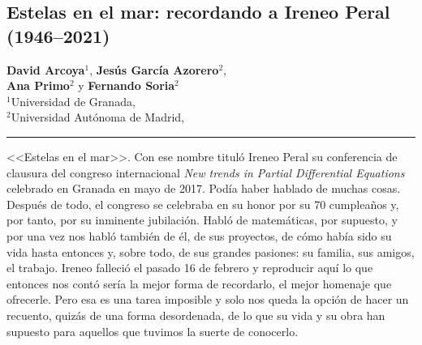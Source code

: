 

%
%

\subsection{Estelas en el mar: recordando a Ireneo Peral (1946--2021)}

\begin{center}\large
\textbf{David Arcoya}$^1$, \textbf{Jes\'us Garc\'ia Azorero}$^2$,\\ \textbf{Ana Primo}$^2$ y
\textbf{Fernando Soria}$^2$\\[1em]
$^1$Universidad de Granada,\\ $^2$Universidad Aut\'onoma de Madrid,\\ 
{\color{azulsema}\rule{.5\linewidth}{1pt}}
\end{center}
%

<<Estelas en el mar>>. Con ese nombre titul\'o Ireneo Peral su conferencia de clausura del congreso internacional {\it New trends in Partial Differential Equations} celebrado en Granada en mayo de 2017. Pod\'ia haber hablado de muchas cosas. Despu\'es de todo, el congreso se celebraba en su honor por su 70 cumplea\~nos y, por tanto, por su inminente jubilaci\'on. Habl\'o de matem\'aticas, por supuesto, y por una vez nos habl\'o tambi\'en de \'el, de sus proyectos, de c\'omo hab\'ia sido su vida hasta entonces y, sobre todo, de sus grandes pasiones: su familia, sus amigos, el trabajo. Ireneo falleci\'o el pasado 16 de febrero y reproducir aqu\'i lo que entonces nos cont\'o ser\'ia la mejor forma de recordarlo, el mejor homenaje que ofrecerle. Pero esa es una tarea imposible y solo nos queda la opci\'on de hacer un recuento, quiz\'as de una forma desordenada, de lo que su vida y su obra han supuesto para aquellos que tuvimos la suerte de conocerlo.

